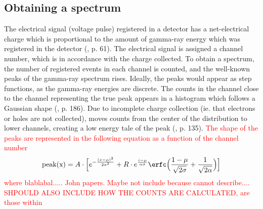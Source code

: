 \subsection{Obtaining a spectrum}

\noindent 
The electrical signal (voltage pulse) registered in a detector has a net-electrical charge which is proportional to the amount of gamma-ray energy which was registered in the detector (\cite{Gilmore2008}, p. 61). The electrical signal is assigned a channel number, which is in accordance with the charge collected. To obtain a spectrum, the number of registered events in each channel is counted, and the well-known peaks of the gamma-ray spectrum rises. Ideally, the peaks would appear as step functions, as the gamma-ray energies are discrete. The counts in the channel close to the channel representing the true peak appears in a histogram which follows a Gaussian shape  (\cite{Gilmore2008}, p. 186). Due to incomplete charge collection (ie. that electrons or holes are not collected), moves counts from the center of the distribution to lower channels, creating a low energy tale of the peak (\cite{Gilmore2008}, p. 135). \textcolor{red}{The shape of the peaks are represented in the following equation as a function of the channel number
\begin{equation}
    \text{peak(x)}= A\cdot \Big[e^{-\frac{(x-\mu)^2}{2\sigma^2}}+ R\cdot e^{\frac{i-\mu}{\alpha \sigma}}\erfc\Big(\frac{1-\mu}{\sqrt{2\sigma}} + \frac{1}{{\sqrt{2\alpha}}} \Big) \Big]
\end{equation} where blablabal..... John papers. Maybe not include because cannot describe.... SHPOULD ALSO INCLUDE HOW THE COUNTS ARE CALCULATED, are those within}  \\

